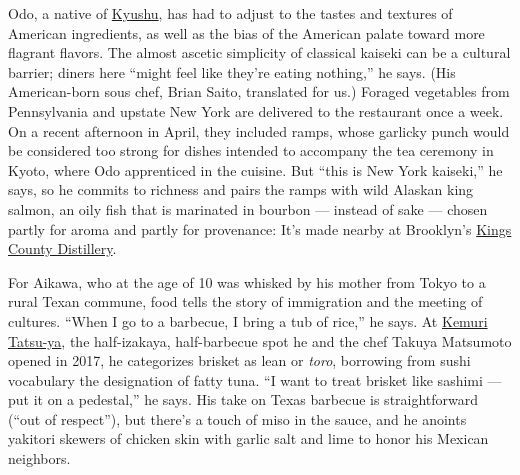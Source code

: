 Odo, a native of
\href{https://www.nytimes3xbfgragh.onion/2017/10/09/t-magazine/travel/new-japan-hotels.html}{Kyushu},
has had to adjust to the tastes and textures of American ingredients, as
well as the bias of the American palate toward more flagrant flavors.
The almost ascetic simplicity of classical kaiseki can be a cultural
barrier; diners here ``might feel like they're eating nothing,'' he
says. (His American-born sous chef, Brian Saito, translated for us.)
Foraged vegetables from Pennsylvania and upstate New York are delivered
to the restaurant once a week. On a recent afternoon in April, they
included ramps, whose garlicky punch would be considered too strong for
dishes intended to accompany the tea ceremony in Kyoto, where Odo
apprenticed in the cuisine. But ``this is New York kaiseki,'' he says,
so he commits to richness and pairs the ramps with wild Alaskan king
salmon, an oily fish that is marinated in bourbon --- instead of sake
--- chosen partly for aroma and partly for provenance: It's made nearby
at Brooklyn's \href{http://kingscountydistillery.com/}{Kings County
Distillery}.

For Aikawa, who at the age of 10 was whisked by his mother from Tokyo to
a rural Texan commune, food tells the story of immigration and the
meeting of cultures. ``When I go to a barbecue, I bring a tub of rice,''
he says. At \href{http://kemuri-tatsuya.com/}{Kemuri Tatsu-ya}, the
half-izakaya, half-barbecue spot he and the chef Takuya Matsumoto opened
in 2017, he categorizes brisket as lean or \emph{toro}, borrowing from
sushi vocabulary the designation of fatty tuna. ``I want to treat
brisket like sashimi --- put it on a pedestal,'' he says. His take on
Texas barbecue is straightforward (``out of respect''), but there's a
touch of miso in the sauce, and he anoints yakitori skewers of chicken
skin with garlic salt and lime to honor his Mexican neighbors.

